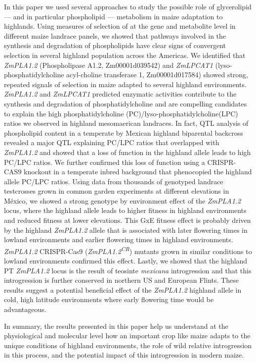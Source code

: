 \documentclass[9pt,twocolumn,twoside,lineno]{BioRxiv}
\begin{document}
In this paper we used several approaches to study the possible role of glycerolipid --- and in particular phospholipid --- metabolism in maize adaptation to highlands. 
Using measures of selection of at the gene and metabolite level in different maize landrace panels, we showed that pathways involved in the synthesis and degradation of phospholipids have clear signs of convergent selection in several highland population across the Americas. 
We identified that \textit{ZmPLA1.2} (Phospholipase A1.2, Zm00001d039542) and \textit{ZmLPCAT1} (lyso-phosphatidylcholine acyl-choline transferase 1, Zm00001d017584) showed strong, repeated signals of selection in maize adapted to several highland environments. 
\textit{ZmPLA1.2} and \textit{ZmLPCAT1} predicted enzymatic activities contribute to the synthesis and degradation of phosphatidylcholine and are compelling candidates to explain the high phosphatidylcholine (PC)/lyso-phosphatidylcholine(LPC) ratios we observed in highland mesomaerican landraces. 
In fact, QTL analysis of phospholipid content in a temperate by Mexican highland biparental backcross revealed a major QTL explaining PC/LPC ratios that overlapped with \textit{ZmPLA1.2} and showed that a loss of function in the highland allele leads to high PC/LPC ratios. 
We further confirmed this loss of function using a CRISPR-CAS9 knockout in a temperate inbred background that phenocopied the highland allele PC/LPC ratios. 
Using data from thousands of genotyped landrace testcrosses grown in common garden experiments at different elevations in México, we showed a strong genotype by environment effect of the \textit{ZmPLA1.2} locus, 
where the highland allele leads to higher fitness in highland environments and reduced fitness at lower elevations. 
This GxE fitness effect is probably driven by the highland \textit{ZmPLA1.2} allele that is associated with later flowering times in lowland environments and earlier flowering times in highland environments. 
\textit{ZmPLA1.2} CRISPR-Cas9 (\textit{ZmPLA1.2\textsuperscript{CR}}) mutants grown in similar conditions to lowland environments confirmed this effect.
Lastly, we showed that the highland PT \textit{ZmPLA1.2} locus is the result of teosinte \textit{mexicana} introgression and that this introgression is further conserved in northern US and European Flints. 
These results suggest a potential beneficial effect of the \textit{ZmPLA1.2} highland allele in cold, high latitude environments where early flowering time would be advantageous.

In summary, the results presented in this paper help us understand at the physiological and molecular level how an important crop like maize adapts to the unique conditions of highland environments, the role of wild relative introgression in this process, and the potential impact of this introgression in modern maize.
\end{document}
